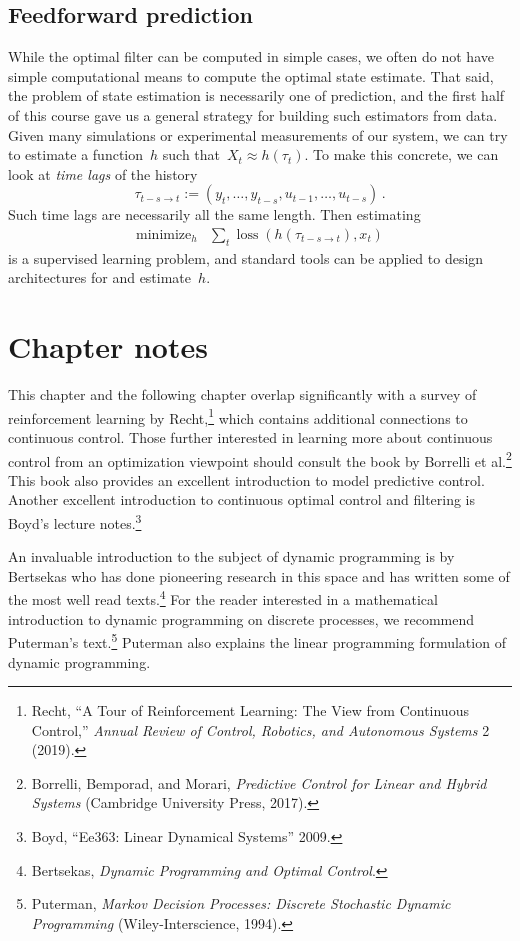 \documentclass{tufte-book}
\begin{document}
\hypertarget{feedforward-prediction}{%
\subsection{Feedforward prediction}\label{feedforward-prediction}}

While the optimal filter can be computed in simple cases, we often do
not have simple computational means to compute the optimal state
estimate. That said, the problem of state estimation is necessarily one
of prediction, and the first half of this course gave us a general
strategy for building such estimators from data. Given many simulations
or experimental measurements of our system, we can try to estimate a
function~\(h\) such that~\(X_t \approx h(\tau_t)\). To make this
concrete, we can look at \emph{time lags} of the history \[
\tau_{t-s\rightarrow t} := (y_t,\ldots, y_{t-s}, u_{t-1}, \ldots, u_{t-s})\,.
\] Such time lags are necessarily all the same length. Then estimating
\[
\begin{array}{ll}
\text{minimize}_h & \sum_t \operatorname{loss}(h(\tau_{t-s\rightarrow t}), x_t)
\end{array}
\] is a supervised learning problem, and standard tools can be applied
to design architectures for and estimate~\(h\).

\hypertarget{chapter-notes-10}{%
\section{Chapter notes}\label{chapter-notes-10}}

This chapter and the following chapter overlap significantly with a
survey of reinforcement learning by Recht,\footnote{Recht, {``A Tour of
  Reinforcement Learning: The View from Continuous Control,''}
  \emph{Annual Review of Control, Robotics, and Autonomous Systems} 2
  (2019).} which contains additional connections to continuous control.
Those further interested in learning more about continuous control from
an optimization viewpoint should consult the book by Borrelli et
al.\footnote{Borrelli, Bemporad, and Morari, \emph{Predictive Control
  for Linear and Hybrid Systems} (Cambridge University Press, 2017).}
This book also provides an excellent introduction to model predictive
control. Another excellent introduction to continuous optimal control
and filtering is Boyd's lecture notes.\footnote{Boyd, {``{Ee363}: Linear
  Dynamical Systems''} 2009.}

An invaluable introduction to the subject of dynamic programming is by
Bertsekas who has done pioneering research in this space and has written
some of the most well read texts.\footnote{Bertsekas, \emph{Dynamic
  Programming and Optimal Control}.} For the reader interested in a
mathematical introduction to dynamic programming on discrete processes,
we recommend Puterman's text.\footnote{Puterman, \emph{Markov Decision
  Processes: Discrete Stochastic Dynamic Programming}
  (Wiley-Interscience, 1994).} Puterman also explains the linear
programming formulation of dynamic programming.
\end{document}
